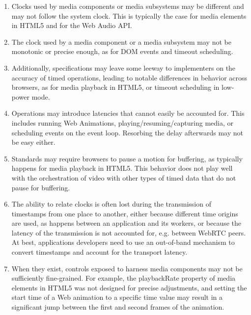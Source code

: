 \begin{enumerate}

\item{
Clocks used by media components or media subsystems may be different and may
not follow the system clock. This is typically the case for media elements in
HTML5 and for the Web Audio API.
}

\item{
The clock used by a media component or a media subsystem may not be monotonic
or precise enough, as for DOM events and timeout scheduling.
}

\item{
Additionally, specifications may leave some leeway to implementers on the
accuracy of timed operations, leading to notable differences in behavior
across browsers, as for media playback in HTML5, or timeout scheduling in 
low-power mode.
}

\item{
Operations may introduce latencies that cannot easily be accounted for. This
includes running Web Animations, playing/resuming/capturing media, or
scheduling events on the event loop. Resorbing the delay afterwards may not be
easy either.
}

\item{
Standards may require browsers to pause a motion for buffering, as typically
happens for media playback in HTML5. This behavior does not play well with the
orchestration of video with other types of timed data that do not pause for
buffering.
}

\item{ The ability to relate clocks is often lost during the transmission of
timestamps from one place to another, either because different time origins
are used, as happens between an application and its workers, or because the
latency of the transmission is not accounted for, e.g. between WebRTC peers.
At best, applications developers need to use an out-of-band mechanism to
convert timestamps and account for the transport latency. }

\item{
When they exist, controls exposed to harness media components may not be
sufficiently fine-grained. For example, the playbackRate property of media
elements in HTML5 was not designed for precise adjustments, and setting the
start time of a Web animation to a specific time value may result in a
significant jump between the first and second frames of the animation.
}

\end{enumerate}

